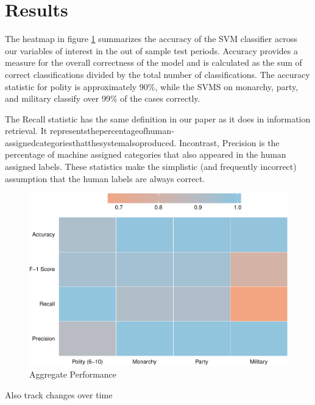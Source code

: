 \documentclass[pdftex,12pt,fullpage,oneside]{amsart}
\begin{document}
\section{Results}

The heatmap in figure \ref{fig:aggPerf} summarizes the accuracy of the SVM classifier across our variables of interest in the out of sample test periods. Accuracy provides a measure for the overall correctness of the model and is calculated as the sum of correct classifications divided by the total number of classifications. The accuracy statistic for polity is approximately 90\%, while the SVMS on monarchy, party, and military classify over 99\% of the cases correctly. 


The Recall statistic has the same definition in our paper as it does in information retrieval. It representsthepercentageofhuman‐assignedcategoriesthatthesystemalsoproduced. Incontrast, Precision is the percentage of machine assigned categories that also appeared in the human assigned labels. These statistics make the simplistic (and frequently incorrect) assumption that the human labels are always correct.

\begin{figure}[ht]
	\centering
	\includegraphics[width=.7\textwidth]{allAggPerf}	
	\caption{Aggregate Performance}
	\label{fig:aggPerf}
\end{figure}
\FloatBarrier

Also track changes over time

\end{document}

